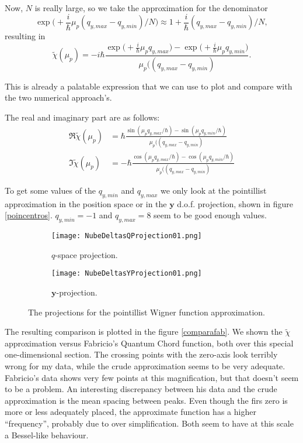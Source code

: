 \documentclass[a4paper,12pt]{article}
\newcommand{\ihb}{\frac{i}{\hbar}}
\newcommand{\yfase}{\mathbf{y}}
\begin{document}
Now, $N$ is really large, so we take the approximation for
the denominator
\begin{equation}
\exp\big(+\ihb \mu_p (q_{y,max}- q_{y,min})/N\big) \approx
1 + \ihb  (q_{y,max}- q_{y,min})/N,
\end{equation}
resulting in 
\begin{equation}
\tilde{\chi}(\mu_p)  = -i\hbar
\frac{\exp\big(+\ihb \mu_p q_{y,max}\big) - \exp\big(+\ihb \mu_p q_{y,min}\big)}
{\mu_p ( (q_{y,max}- q_{y,min})}.
\end{equation}

This is already a palatable expression that we can use to plot and compare with 
the two numerical approach's. 

The real and imaginary part are as follows:
\begin{align}
\Re \tilde{\chi} (\mu_p)  &= \hbar
\frac{\sin(\mu_p q_{y,max} /\hbar)-\sin(\mu_p q_{y,min} /\hbar)}
{\mu_p ( (q_{y,max}- q_{y,min})} \\
\Im \tilde{\chi} (\mu_p)  &= -\hbar
\frac{\cos(\mu_p q_{y,max} /\hbar)-\cos(\mu_p q_{y,min} /\hbar)}
{\mu_p ( (q_{y,max}- q_{y,min})} 
\end{align}

To get some values of the $q_{y,min}$ and $q_{y,max}$ we only look
at the pointillist approximation in the position space
 or in the $\yfase$ d.o.f. projection, shown in figure \ref{poincentros}.
$q_{y,min}=-1$ and $q_{y,max}=8$ seem to be good enough values.

\begin{figure}[h]
 \centering
  \begin{subfigure}[b]{0.45\textwidth}
    \centering
          \texttt{[image: NubeDeltasQProjection01.png]}
                \caption{$q$-space projection.}
                \label{NubeQ}
  \end{subfigure}%
\begin{subfigure}[b]{0.45\textwidth}
    \centering
          \texttt{[image: NubeDeltasYProjection01.png]}
                \caption{$\yfase$-projection.}
                \label{NubeY}
  \end{subfigure}%
\caption{The projections for the pointillist Wigner function approximation. }\label{poincentros}\label{nubes}
\end{figure}

The resulting comparison is plotted in the figure \ref{comparafab}. We shown the
$\tilde{ \chi }$ approximation versus Fabricio's Quantum Chord function, both
over this special one-dimensional section. The
crossing points with the zero-axis look terribly wrong for my data,
while the crude approximation seems to be very adequate. Fabricio's data
shows very few points at this magnification, but that doesn't seem to be a
problem. An interesting discrepancy between his data and the crude approximation
is the mean spacing between peaks. Even though the firs zero is more or
less adequately placed, the approximate function has a higher 
``frequency'', probably due to over simplification. Both seem to have at
this scale a Bessel-like behaviour.   
\end{document}
